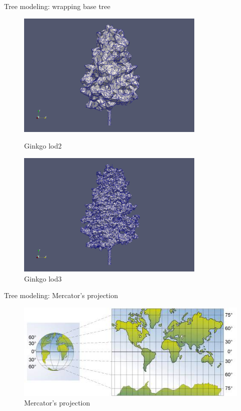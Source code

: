 \documentclass[10pt]{beamer}
\begin{document}
\begin{frame}{Tree modeling: wrapping base tree}
\begin{figure}[H]
    \centering
    \begin{minipage}{0.49\textwidth}
        \centering
        \includegraphics[width=0.8\textwidth]{images/gingko_lod2.png}
        \caption{Ginkgo lod2}
    \end{minipage}\hfill
    \begin{minipage}{0.49\textwidth}
        \centering
        \includegraphics[width=0.8\textwidth]{images/gingko_lod3.png}
        \caption{Ginkgo lod3}
    \end{minipage}
\end{figure}
\end{frame}

\begin{frame}{Tree modeling: Mercator's projection}
  \begin{figure}[H]
    \centering
    \includegraphics[width=\textwidth]{images/mercator.jpg}
    \caption{Mercator's projection\cite{img:mercator}}
\end{figure}

\end{frame}
\end{document}
